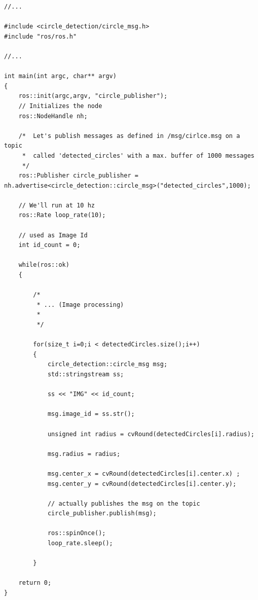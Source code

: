 \documentclass[9pt,a4paper,DIV=11]{scrartcl}
\begin{document}
\begin{lstlisting}[morekeywords={string,ros,std},caption={Kommunikation in einem ROS Knoten},label={lst:src}]
//...

#include <circle_detection/circle_msg.h>
#include "ros/ros.h"

//...

int main(int argc, char** argv)
{
    ros::init(argc,argv, "circle_publisher");
    // Initializes the node
    ros::NodeHandle nh;

    /*  Let's publish messages as defined in /msg/cirlce.msg on a topic 
	 *  called 'detected_circles' with a max. buffer of 1000 messages     
     */ 
    ros::Publisher circle_publisher = nh.advertise<circle_detection::circle_msg>("detected_circles",1000); 

	// We'll run at 10 hz
    ros::Rate loop_rate(10);
    
    // used as Image Id
    int id_count = 0;

    while(ros::ok)
    {
       
       	/*
       	 * ... (Image processing)
       	 *
       	 */

        for(size_t i=0;i < detectedCircles.size();i++)
        {
            circle_detection::circle_msg msg;
            std::stringstream ss;

            ss << "IMG" << id_count;

            msg.image_id = ss.str();

            unsigned int radius = cvRound(detectedCircles[i].radius);

            msg.radius = radius;

            msg.center_x = cvRound(detectedCircles[i].center.x) ;
            msg.center_y = cvRound(detectedCircles[i].center.y);
            
            // actually publishes the msg on the topic
            circle_publisher.publish(msg);

            ros::spinOnce();
            loop_rate.sleep();

        }

    return 0;
}
\end{lstlisting}





\newpage
\listoffigures
\newpage
\listoftables
\newpage


\end{document}
